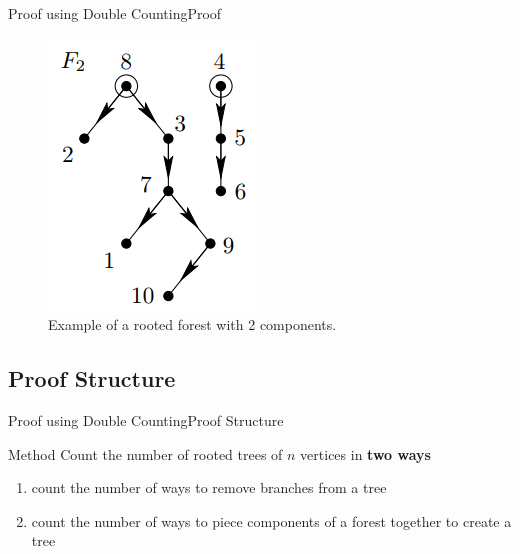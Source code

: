 \documentclass[10pt]{beamer}
\theoremstyle{definition}
\newcommand{\Stwo}{Proof using Double Counting}
\newcommand{\StwoSSstructure}{Proof Structure}
\newcommand{\StwoSSproof}{Proof}
\begin{document}
\begin{frame}{\Stwo}{\StwoSSproof}

\begin{figure}
  \includegraphics[width=0.4\linewidth]{images/section2_example.png}
  \caption{Example of a rooted forest with 2 components.}
  \label{fig:section2_example}
\end{figure}

\end{frame}

\subsection{\StwoSSstructure}
\begin{frame}{\Stwo}{\StwoSSstructure}
\begin{block}{Method}
Count the number of rooted trees of $n$ vertices in \textbf{two ways}
\begin{enumerate}
  \item count the number of ways to remove branches from a tree
  \pause{}
  \item count the number of ways to piece components of a forest together to create a tree
\end{enumerate}
\end{block}

\end{frame}

\end{document}
